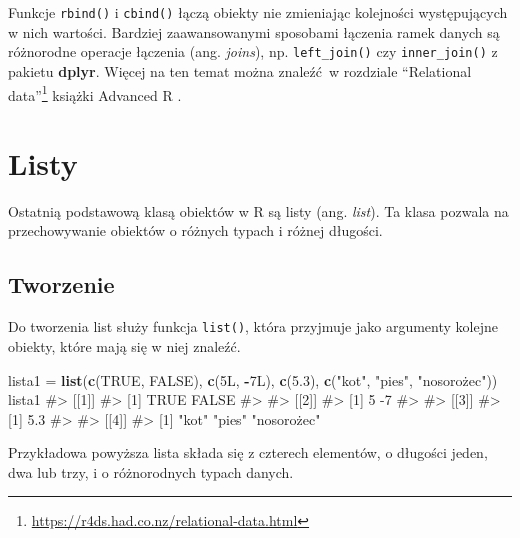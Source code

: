 \documentclass[paper=6in:9in,pagesize=pdftex,headinclude=on,footinclude=on,10pt]{scrbook}
\newenvironment{Shaded}{\begin{snugshade}}{\end{snugshade}}
\newcommand{\FloatTok}[1]{\textcolor[rgb]{0.00,0.00,0.81}{#1}}
\newcommand{\KeywordTok}[1]{\textcolor[rgb]{0.13,0.29,0.53}{\textbf{#1}}}
\newcommand{\NormalTok}[1]{#1}
\newcommand{\OperatorTok}[1]{\textcolor[rgb]{0.81,0.36,0.00}{\textbf{#1}}}
\newcommand{\OtherTok}[1]{\textcolor[rgb]{0.56,0.35,0.01}{#1}}
\newcommand{\StringTok}[1]{\textcolor[rgb]{0.31,0.60,0.02}{#1}}
\DeclareRobustCommand{\href}[2]{#2\footnote{\url{#1}}}
\let\BeginKnitrBlock\begin \let\EndKnitrBlock\end
\begin{document}
\BeginKnitrBlock{rmdinfo}
Funkcje \texttt{rbind()} i \texttt{cbind()} łączą obiekty nie zmieniając kolejności występujących w nich wartości.
Bardziej zaawansowanymi sposobami łączenia ramek danych są różnorodne operacje łączenia (ang. \emph{joins}), np. \texttt{left\_join()} czy \texttt{inner\_join()} z pakietu \textbf{dplyr}.
Więcej na ten temat można znaleźć~w rozdziale \href{https://r4ds.had.co.nz/relational-data.html}{``Relational data''} książki Advanced R \citep{wickham2014advanced}.
\EndKnitrBlock{rmdinfo}

\hypertarget{listy}{%
\section{Listy}\label{listy}}

Ostatnią podstawową klasą obiektów w R są listy (ang. \emph{list}).
Ta klasa pozwala na przechowywanie obiektów o różnych typach i różnej długości.

\hypertarget{tworzenie-2}{%
\subsection{Tworzenie}\label{tworzenie-2}}

Do tworzenia list służy funkcja \texttt{list()}, która przyjmuje jako argumenty kolejne obiekty, które mają się w niej znaleźć.

\begin{Shaded}
\begin{Highlighting}[]
\NormalTok{lista1 =}\StringTok{ }\KeywordTok{list}\NormalTok{(}\KeywordTok{c}\NormalTok{(}\OtherTok{TRUE}\NormalTok{, }\OtherTok{FALSE}\NormalTok{), }
              \KeywordTok{c}\NormalTok{(5L, }\OperatorTok{-}\NormalTok{7L),}
              \KeywordTok{c}\NormalTok{(}\FloatTok{5.3}\NormalTok{), }
              \KeywordTok{c}\NormalTok{(}\StringTok{"kot"}\NormalTok{, }\StringTok{"pies"}\NormalTok{, }\StringTok{"nosorożec"))}
\StringTok{lista1}
\StringTok{#> [[1]]}
\StringTok{#> [1]  TRUE FALSE}
\StringTok{#> }
\StringTok{#> [[2]]}
\StringTok{#> [1]  5 -7}
\StringTok{#> }
\StringTok{#> [[3]]}
\StringTok{#> [1] 5.3}
\StringTok{#> }
\StringTok{#> [[4]]}
\StringTok{#> [1] "}\NormalTok{kot}\StringTok{"       "}\NormalTok{pies}\StringTok{"      "}\NormalTok{nosorożec"}
\end{Highlighting}
\end{Shaded}

Przykładowa powyższa lista składa się z czterech elementów, o długości jeden, dwa lub trzy, i o różnorodnych typach danych.
\end{document}

